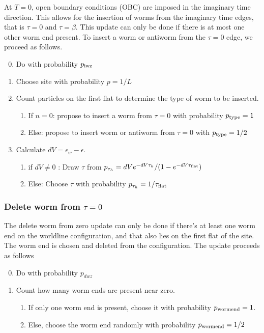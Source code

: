 \documentclass[12pt, two sided]{article}
\begin{document}
    At $T=0$, open boundary conditions (OBC) are imposed in the imaginary time direction.  This allows for the insertion of worms from the imaginary time edges, that is $\tau=0$ and $\tau=\beta$. This update can only be done if there is at most one other worm end present. To insert a worm or antiworm from the $\tau=0$ edge, we proceed as follows.
    
    \begin{enumerate}
        \setcounter{enumi}{-1}
    \item Do with probability $p_{\rm{iwz}}$
    \item Choose site with probability $p=1/L$
    \item Count particles on the first flat to determine the type of worm to be inserted.
    \begin{enumerate}
    \item{If $n=0$: propose to insert a worm from $\tau=0$ with probability $p_{\rm{type}}=1$}
    \item{Else: propose to insert worm or antiworm from $\tau=0$ with $p_{\rm{type}}=1/2$}
    \end{enumerate}
    \item{Calculate $dV=\epsilon_{w}-\epsilon$.}
    \begin{enumerate}
    \item{if $dV \neq 0$ : Draw $\tau$ from $p_{\tau_h}=dV e^{-dV\tau_h}/(1-e^{-dV \tau_{\rm{flat}}})$}
    \item{Else: Choose $\tau$ with probability $p_{\tau_h} = 1/\tau_{\rm{flat}}$ }
    \end{enumerate}
    \end{enumerate}

    \subsubsection{Delete worm from $\tau=0$}
    
    The delete worm from zero update can only be done if there's at least one worm end on the worldline configuration, and that also lies on the first flat of the site. The worm end is chosen and deleted from the configuration. The update proceeds as follows
    
    \begin{enumerate}
        \setcounter{enumi}{-1}
    \item Do with probability $p_{dwz}$
    \item Count how many worm ends are present near zero.
    \begin{enumerate}
    \item{If only one worm end is present, choose it with probability $p_{\rm{wormend}}=1$}.
    \item{Else, choose the worm end randomly with probability $p_{\rm{wormend}}=1/2$}
    \end{enumerate}
    \end{enumerate}
    
\end{document}
